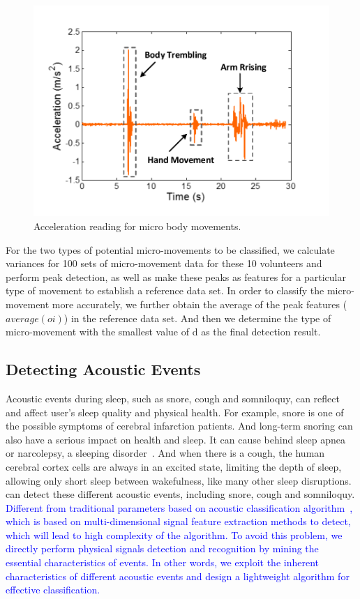 \begin{figure}[!t]
\centering
      \includegraphics[width=0.43\linewidth]{Figures/Micromovement.pdf}
  \caption{Acceleration reading for micro body movements.}\label{fig:micro-move}
\end{figure}

For the two types of potential micro-movements to be classified, we calculate variances for 100 sets of micro-movement data for these 10 volunteers and perform peak detection, as well as make these peaks as features for a particular type of movement to establish a reference data set. In order to classify the micro-movement more accurately, we further obtain the average of the peak features ($average(oi)$) in the reference data set. And then we determine the type of micro-movement with the smallest value of d as the final detection result.


\subsection{Detecting Acoustic Events \label{sec:acoustic}}
Acoustic events during sleep, such as snore, cough and somniloquy, can reflect and affect user's sleep quality and physical health. For example, snore is one of the possible symptoms of cerebral infarction patients.  And long-term snoring can also have a serious impact on health and sleep. It can cause behind sleep apnea or narcolepsy, a sleeping disorder~\cite{snoring2016,snoring2013}. And when there is a cough, the human cerebral cortex cells are always in an excited state, limiting the depth of sleep, allowing only short sleep between wakefulness, like many other sleep disruptions. {\systemname} can detect these different acoustic events, including snore, cough and somniloquy.
\textcolor{blue}{Different from traditional parameters based on acoustic classification algorithm~\cite{gu2016sleep}, which is based on multi-dimensional signal feature extraction methods to detect, which will lead to high complexity of the algorithm. To avoid this problem, we directly perform physical signals detection and recognition by mining the essential characteristics of events. In other words, we exploit the inherent characteristics of different acoustic events and design a lightweight algorithm for effective classification.}%

